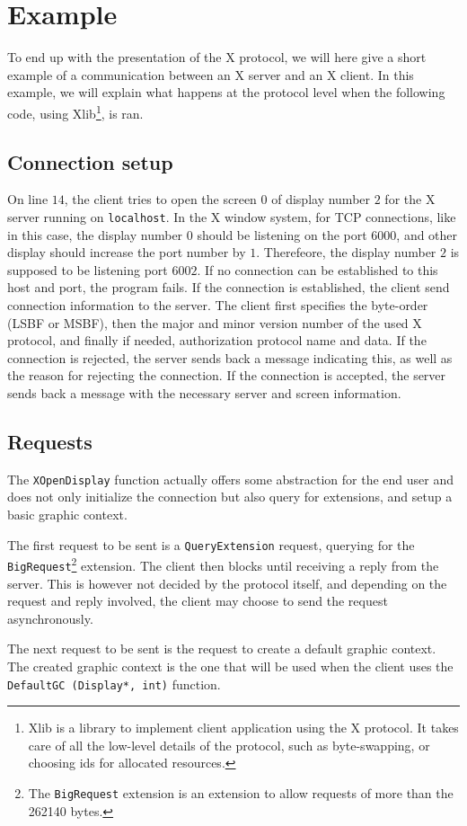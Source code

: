 \section{Example}
To end up with the presentation of the X protocol, we will here give a
short example of a communication between an X server and an X client. 
In this example, we will explain what happens at the protocol level 
when the following code, using Xlib\footnote{Xlib is a library to implement client
application using the X protocol. It takes care of all the low-level details of the 
protocol, such as byte-swapping, or choosing ids for allocated resources.}, is ran.
%

%
\subsection{Connection setup}
On line $14$, the client tries to open the screen $0$ of display number $2$
for the X server running on \lstinline{localhost}. In the X window system, for TCP connections,
like in this case, the display number $0$ should be listening on the port $6000$, and 
other display should increase the port number by $1$. Therefeore, the display number $2$ is 
supposed to be listening port $6002$. If no connection can be established to this host and port, 
the program fails. If the connection is established, the client send connection information to 
the server. The client first specifies the byte-order (LSBF or MSBF), then the major and 
minor version number of the used X protocol, and finally if needed, authorization protocol 
name and data.
%
If the connection is rejected, the server sends back a message indicating this, as well 
as the reason for rejecting the connection.
%
If the connection is accepted, the server sends back a message with the necessary server and 
screen information.
\subsection{Requests}
The \lstinline{XOpenDisplay} function actually offers some abstraction for the end user and
does not only initialize the connection but also query for extensions, and setup a basic 
graphic context. 

The first request to be sent is a \lstinline{QueryExtension} request, querying for the 
\lstinline{BigRequest}\footnote{The \lstinline{BigRequest} extension is 
  an extension to allow requests of more than the 262140 bytes.} extension. The client then blocks 
until receiving a reply from the server. This is however not decided by the protocol itself, 
and depending on the request and reply involved, the client may choose to send the request 
asynchronously.

The next request to be sent is the request to create a default graphic context. 
The created graphic context is the one that will be used when the client uses the 
\lstinline{DefaultGC (Display*, int)} function.